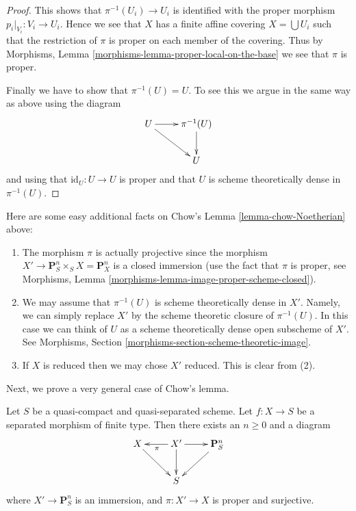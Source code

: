 \begin{proof}
\medskip\noindent
This shows that $\pi^{-1}(U_i) \to U_i$ is identified with the proper
morphism $p_i|_{V_i} : V_i \to U_i$. Hence we see that $X$ has a
finite affine covering $X = \bigcup U_i$ such that the restriction
of $\pi$ is proper on each member of the covering.
Thus by Morphisms, Lemma \ref{morphisms-lemma-proper-local-on-the-base}
we see that $\pi$ is proper.

\medskip\noindent
Finally we have to show that $\pi^{-1}(U) = U$. To see this we argue in the
same way as above using the diagram
$$
\xymatrix{
U \ar[r] \ar[rd] & \pi^{-1}(U) \ar[d] \\
& U
}
$$
and using that $\text{id}_U : U \to U$ is proper and that
$U$ is scheme theoretically dense in $\pi^{-1}(U)$.
\end{proof}

\begin{remark}
\label{remark-chow-Noetherian}
Here are some easy additional facts on
Chow's Lemma \ref{lemma-chow-Noetherian} above:
\begin{enumerate}
\item The morphism $\pi$ is actually projective since the morphism
$X' \to \mathbf{P}^n_S \times_S X = \mathbf{P}^n_X$ is a closed
immersion (use the fact that $\pi$ is proper, see
Morphisms, Lemma \ref{morphisms-lemma-image-proper-scheme-closed}).
\item We may assume that $\pi^{-1}(U)$ is scheme theoretically dense
in $X'$. Namely, we can simply replace $X'$ by the scheme theoretic
closure of $\pi^{-1}(U)$. In this case we can think of $U$ as a
scheme theoretically dense open subscheme of $X'$.
See Morphisms, Section \ref{morphisms-section-scheme-theoretic-image}.
\item If $X$ is reduced then we may chose $X'$ reduced. This is clear
from (2).
\end{enumerate}
\end{remark}

\noindent
Next, we prove a very general case of Chow's lemma.

\begin{lemma}
\label{lemma-chow-finite-type}
Let $S$ be a quasi-compact and quasi-separated scheme.
Let $f : X \to S$ be a separated morphism of finite type.
Then there exists an $n \geq 0$ and a diagram
$$
\xymatrix{
X \ar[rd] & X' \ar[d] \ar[l]^\pi \ar[r] & \mathbf{P}^n_S \ar[dl] \\
& S &
}
$$
where $X' \to \mathbf{P}^n_S$ is an immersion, and
$\pi : X' \to X$ is proper and surjective.
\end{lemma}


